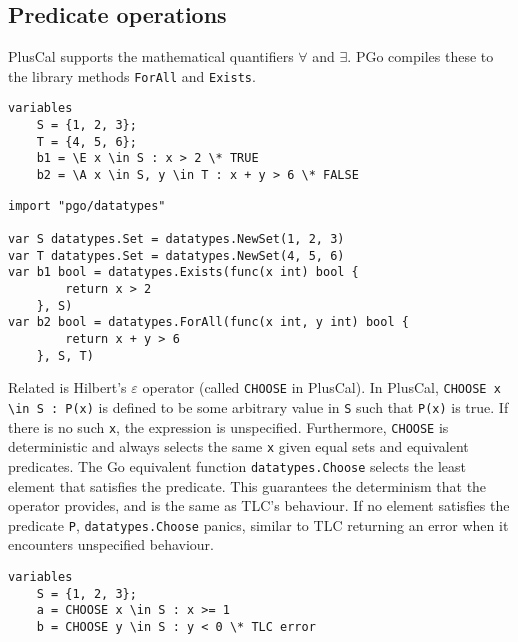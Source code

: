 \subsection{Predicate operations}
PlusCal supports the mathematical quantifiers $\forall$ and $\exists$. PGo compiles these to the library methods \texttt{ForAll} and \texttt{Exists}.

\noindent
\begin{minipage}[t]{\textwidth}
\begin{lstlisting}[language=pcal]
variables
	S = {1, 2, 3};
	T = {4, 5, 6};
	b1 = \E x \in S : x > 2 \* TRUE
	b2 = \A x \in S, y \in T : x + y > 6 \* FALSE
\end{lstlisting}
\end{minipage}

\noindent
\begin{minipage}[t]{\textwidth}
\begin{lstlisting}[language=golang]
import "pgo/datatypes"

var S datatypes.Set = datatypes.NewSet(1, 2, 3)
var T datatypes.Set = datatypes.NewSet(4, 5, 6)
var b1 bool = datatypes.Exists(func(x int) bool {
		return x > 2
	}, S)
var b2 bool = datatypes.ForAll(func(x int, y int) bool {
		return x + y > 6
	}, S, T)
\end{lstlisting}
\end{minipage}

Related is Hilbert's $\varepsilon$ operator (called \texttt{CHOOSE} in PlusCal). In PlusCal, \verb|CHOOSE x \in S : P(x)| is defined to be some arbitrary value in \texttt{S} such that \texttt{P(x)} is true. If there is no such \texttt{x}, the expression is unspecified. Furthermore, \texttt{CHOOSE} is deterministic and always selects the same \texttt{x} given equal sets and equivalent predicates. The Go equivalent function \texttt{datatypes.Choose} selects the least element that satisfies the predicate. This guarantees the determinism that the operator provides, and is the same as TLC's behaviour. If no element satisfies the predicate \texttt{P}, \texttt{datatypes.Choose} panics, similar to TLC returning an error when it encounters unspecified behaviour.

\noindent
\begin{minipage}[t]{\textwidth}
\begin{lstlisting}[language=pcal]
variables
	S = {1, 2, 3};
	a = CHOOSE x \in S : x >= 1
	b = CHOOSE y \in S : y < 0 \* TLC error
\end{lstlisting}
\end{minipage}

